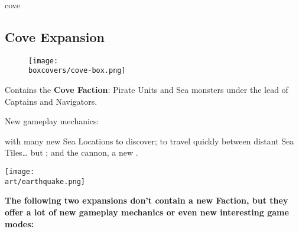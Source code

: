\begin{multicols}{2}
\begin{expansion}[title=]{cove}
    \subsection*{\color{cove}Cove Expansion}
    \setlength\intextsep{0pt}
    \setlength\columnsep{0.8em}
    \begin{wrapfigure}{l}{0.35\textwidth}
        \texttt{[image: \\boxcovers/cove-box.png]}
    \end{wrapfigure}
    Contains the \textbf{Cove Faction}: Pirate Units and Sea monsters under the lead of Captains and Navigators.\par
    \medskip
    New gameplay mechanics:\par
    \smallskip
     with many new Sea Locations to discover;  to travel quickly between distant Sea Tiles… but ; and the cannon, a new .
\end{expansion}

\begin{center}
\hfill{}\texttt{[image: \\art/earthquake.png]}
\end{center}

\end{multicols}

\textbf{The following two expansions don't contain a new Faction, but they offer a lot of new gameplay mechanics or even new interesting game modes:}

